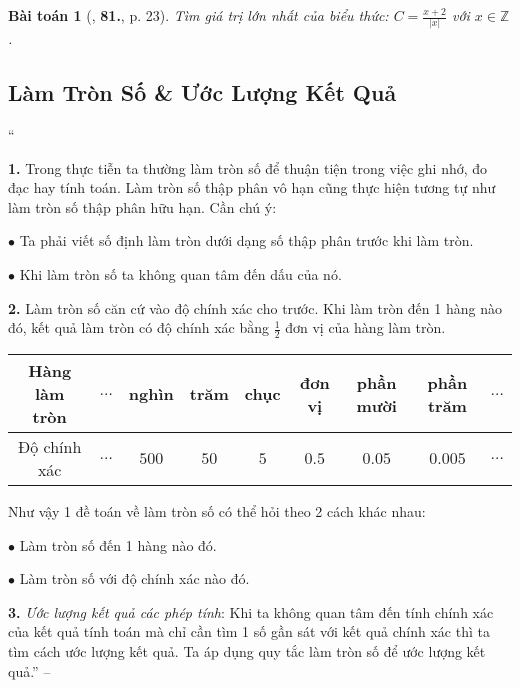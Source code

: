\documentclass{article}
\numberwithin{equation}{section}
\newtheorem{baitoan}{Bài toán}
\begin{document}
\begin{baitoan}[\cite{Binh_Toan_7_tap_1}, \textbf{81.}, p. 23]
	Tìm giá trị lớn nhất của biểu thức: $C = \frac{x + 2}{|x|}$ với $x\in\mathbb{Z}$.
\end{baitoan}


\subsection{Làm Tròn Số \& Ước Lượng Kết Quả}
``\begin{enumerate*}
	\item[\textbf{1.}] Trong thực tiễn ta thường làm tròn số để thuận tiện trong việc ghi nhớ, đo đạc hay tính toán. Làm tròn số thập phân vô hạn cũng thực hiện tương tự như làm tròn số thập phân hữu hạn. Cần chú ý:
	\begin{enumerate*}
		\item[$\bullet$] Ta phải viết số định làm tròn dưới dạng số thập phân trước khi làm tròn.
		\item[$\bullet$] Khi làm tròn số ta không quan tâm đến dấu của nó.
	\end{enumerate*}
	\item[\textbf{2.}] Làm tròn số căn cứ vào độ chính xác cho trước. Khi làm tròn đến 1 hàng nào đó, kết quả làm tròn có độ chính xác bằng $\frac{1}{2}$ đơn vị của hàng làm tròn.
\end{enumerate*}
\begin{table}[H]
	\centering
	\begin{tabular}{|c|c|c|c|c|c|c|c|c|}
		\hline
		Hàng làm tròn & $\ldots$ & nghìn & trăm & chục & đơn vị & phần mười & phần trăm & $\ldots$ \\
		\hline
		Độ chính xác & $\ldots$ & $500$ & $50$ & $5$ & $0.5$ & $0.05$ & $0.005$ & $\ldots$ \\
		\hline
	\end{tabular}
\end{table}
Như vậy 1 đề toán về làm tròn số có thể hỏi theo 2 cách khác nhau:
\begin{enumerate*}
	\item[$\bullet$] Làm tròn số đến 1 hàng nào đó.
	\item[$\bullet$] Làm tròn số với độ chính xác nào đó.
\end{enumerate*}
\textbf{3.} \textit{Ước lượng kết quả các phép tính}: Khi ta không quan tâm đến tính chính xác của kết quả tính toán mà chỉ cần tìm 1 số gần sát với kết quả chính xác thì ta tìm cách ước lượng kết quả. Ta áp dụng quy tắc làm tròn số để ước lượng kết quả.'' -- \cite[Chap. 2, \S4, pp. 23--24]{Tuyen_Toan_7}
\end{document}
